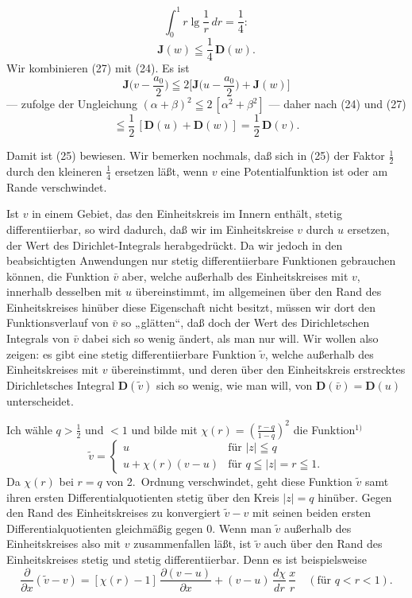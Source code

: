 \documentclass{article}
\begin{document}
\[ \int_0^1 r \lg\frac{1}{r}\,dr = \frac{1}{4}\colon \]
\[ \mathbf{J}(w) \leqq \frac{1}{4}\,\mathbf{D}(w). \tag{27} \]
Wir kombinieren (27) mit (24). Es ist
\[ \mathbf{J}\Big( v - \frac{a_0}{2} \Big) \leqq 2 \Big[ \mathbf{J}\Big( u - \frac{a_0}{2} \Big) + \mathbf{J}(w) \Big] \]
--- zufolge der Ungleichung $(\alpha + \beta)^2 \leqq 2\,[\alpha^2 + \beta^2]$ --- daher nach (24) und (27)
\[ \leqq \frac{1}{2}\,[\mathbf{D}(u) + \mathbf{D}(w)] = \frac{1}{2}\,\mathbf{D}(v). \]

Damit ist (25) bewiesen. Wir bemerken nochmals, daß sich in (25) der Faktor $\frac{1}{2}$ durch den kleineren $\frac{1}{4}$ ersetzen läßt, wenn $v$ eine Potentialfunktion ist oder am Rande verschwindet.

Ist $v$ in einem Gebiet, das den Einheitskreis im Innern enthält, stetig differentiierbar, so wird dadurch, daß wir im Einheitskreise $v$ durch $u$ ersetzen, der Wert des Dirichlet-Integrals herabgedrückt. Da wir jedoch in den beabsichtigten Anwendungen nur stetig differentiierbare Funktionen gebrauchen können, die Funktion $\bar{v}$ aber, welche außerhalb des Einheitskreises mit $v$, innerhalb desselben mit $u$ übereinstimmt, im allgemeinen über den Rand des Einheitskreises hinüber diese Eigenschaft nicht besitzt, müssen wir dort den Funktionsverlauf von $\bar{v}$ so „glätten“, daß doch der Wert des Dirichletschen Integrals von $\bar{v}$ dabei sich so wenig ändert, als man nur will. Wir wollen also zeigen: es gibt eine stetig differentiierbare Funktion $\tilde{v}$, welche außerhalb des Einheitskreises mit $v$ übereinstimmt, und deren über den Einheitskreis erstrecktes Dirichletsches Integral $\mathbf{D}(\tilde{v})$ sich so wenig, wie man will, von $\mathbf{D}(\bar{v}) = \mathbf{D}(u)$ unterscheidet.

Ich wähle $q > \frac{1}{2}$ und $< 1$ und bilde mit $\chi(r) = \left( \frac{r - q}{1 - q} \right)^2$ die Funktion${}^{1)}$
\[ \tilde{v} = \begin{cases}
u & \text{für } |z| \leqq q \\
u + \chi(r)(v - u) & \text{für } q \leqq |z| = r \leqq 1.
\end{cases} \]
Da $\chi(r)$ bei $r = q$ von 2.\ Ordnung verschwindet, geht diese Funktion $\tilde{v}$ samt ihren ersten Differentialquotienten stetig über den Kreis $|z| = q$ hinüber. Gegen den Rand des Einheitskreises zu konvergiert $\tilde{v} - v$ mit seinen beiden ersten Differentialquotienten gleichmäßig gegen $0$. Wenn man $\tilde{v}$ außerhalb des Einheitskreises also mit $v$ zusammenfallen läßt, ist $\tilde{v}$ auch über den Rand des Einheitskreises stetig und stetig differentiierbar. Denn es ist beispielsweise
\[ \frac{\partial}{\partial x}(\tilde{v} - v) = [\chi(r) - 1]\,\frac{\partial(v - u)}{\partial x} + (v - u)\,\frac{d\chi}{dr}\,\frac{x}{r} \quad (\text{für } q < r < 1). \]
\end{document}
